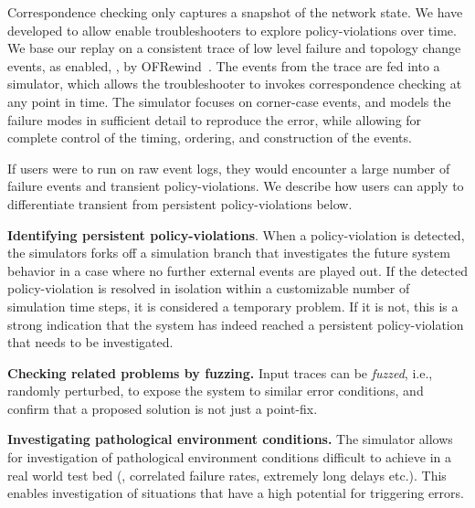 
Correspondence checking only captures a snapshot of the network state.
We have developed \simulator{} to allow enable troubleshooters to explore
policy-violations over time. We base our replay on a consistent
trace of low level failure and topology change events, as enabled,
\eg{}, by OFRewind~\cite{ofrewind}. The
events from the trace are fed into a simulator, which allows the
troubleshooter to invokes correspondence
checking at any point in time. The simulator focuses on corner-case events,
and models the failure modes in sufficient detail to reproduce the error, while
allowing for complete control of the timing, ordering, and construction of the events.


If users were to run \simulator{} on raw event logs, they would encounter a
large number of failure events and transient policy-violations. We describe
how users can apply \simulator{} to differentiate transient from persistent
policy-violations below.

\textbf{Identifying persistent policy-violations}. When a policy-violation is detected,
the simulators forks off a simulation branch that investigates the future system behavior
in a case where no further external events are played out. If the detected
policy-violation
is resolved in isolation within a customizable number of simulation time steps, it is considered
a temporary problem. If it is not, this is a strong indication that the system has indeed
reached a persistent policy-violation that needs to be investigated.

\textbf{Checking related problems by fuzzing.} Input traces can be \emph{fuzzed}, i.e.,
randomly perturbed, to expose the system to similar error conditions, and confirm
that a proposed solution is not just a point-fix.

\textbf{Investigating pathological environment conditions.} The simulator allows for investigation
of pathological environment conditions difficult to achieve in a real world test bed
(\eg{}, correlated failure rates, extremely long delays etc.). This enables
investigation of situations that have a high potential for triggering errors.

